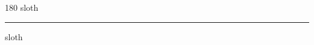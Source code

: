 
\begin{frame}
\begin{center}
\begin{turn}{180}
{\fontsize{2.5cm}{1em}\selectfont sloth}
\end{turn}
\vspace{1em}\par  
\hrule
\vspace{1em}\par  
{\fontsize{2.5cm}{1em}\selectfont sloth}
\end{center}
\end{frame}
